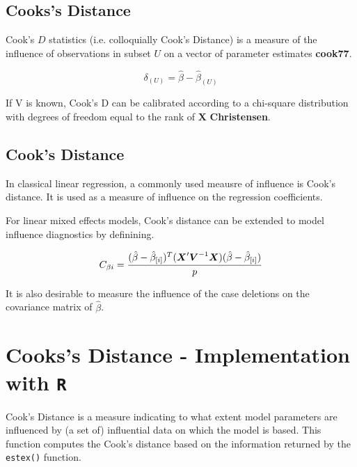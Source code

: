 \documentclass[12pt, a4paper]{article}
\begin{document}
\subsection{Cooks's Distance}%
Cook's $D$ statistics (i.e. colloquially Cook's Distance) is a measure of the influence of observations in subset $U$ on a vector of parameter estimates \textbf{cook77}.

\[ \delta_{(U)} = \hat{\beta} - \hat{\beta}_{(U)}\]

If V is known, Cook's D can be calibrated according to a chi-square distribution with degrees of freedom equal to the rank of $\boldsymbol{X}$ \textbf{Christensen}.


\subsection{Cook's Distance}%
In classical linear regression, a commonly used meausre of influence is Cook's distance. It is used as a measure of influence on the regression coefficients.

For linear mixed effects models, Cook's distance can be extended to model influence diagnostics by definining.

\[ C_{\beta i} = {(\hat{\beta} - \hat{\beta}_{[i]})^{T}(\boldsymbol{X}^{\prime}\boldsymbol{V}^{-1}\boldsymbol{X}) (\hat{\beta} - \hat{\beta}_{[i]}) \over p}\]

It is also desirable to measure the influence of the case deletions on the covariance matrix of $\hat{\beta}$.

\newpage
	\section{Cooks's Distance - Implementation with \texttt{R}}
	Cook's Distance is a measure indicating to what extent model parameters are influenced by (a set of) influential data on which the model is based. This function computes the Cook's distance based on the information returned by the \texttt{estex()} function.
	
	
	
	
\end{document}
